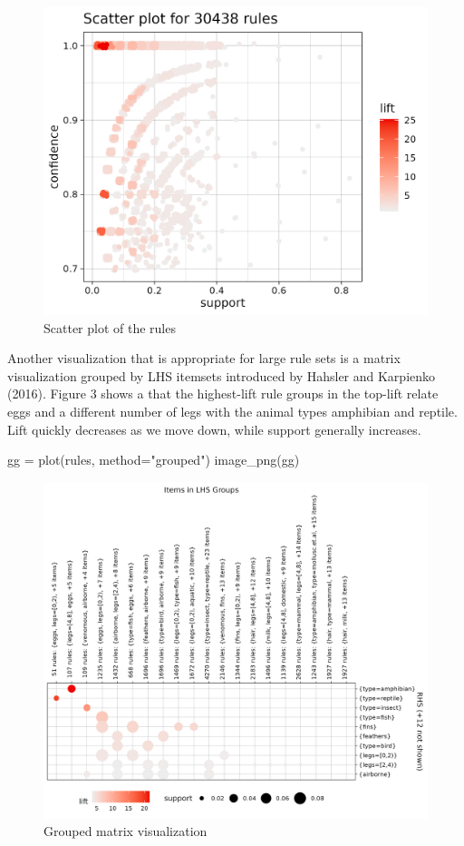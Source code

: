 \documentclass{article}
\newenvironment{Shaded}{}{}
\newcommand{\NormalTok}[1]{#1}
\newcommand{\OperatorTok}[1]{\textcolor[rgb]{0.40,0.40,0.40}{#1}}
\newcommand{\StringTok}[1]{\textcolor[rgb]{0.25,0.44,0.63}{#1}}
\begin{document}
\begin{figure}

{\centering \includegraphics[width=0.6\linewidth]{scatter} 

}

\caption{Scatter plot of the rules}\label{fig:scatter}
\end{figure}

Another visualization that is appropriate for large rule sets is a
matrix visualization grouped by LHS itemsets introduced by Hahsler and
Karpienko (2016). Figure 3 shows a that the highest-lift rule groups in
the top-lift relate eggs and a different number of legs with the animal
types amphibian and reptile. Lift quickly decreases as we move down,
while support generally increases.

\begin{Shaded}
\begin{Highlighting}[]
\NormalTok{gg }\OperatorTok{=}\NormalTok{ plot(rules, method}\OperatorTok{=}\StringTok{"grouped"}\NormalTok{)}
\NormalTok{image\_png(gg)}
\end{Highlighting}
\end{Shaded}

\begin{figure}

{\centering \includegraphics[width=0.8\linewidth]{grouped} 

}

\caption{Grouped matrix visualization}\label{fig:grouped}
\end{figure}
\end{document}
